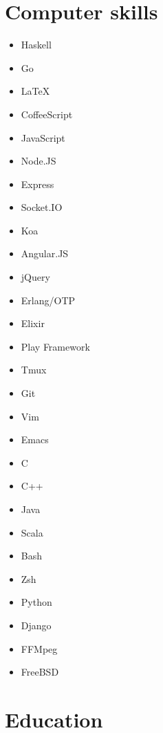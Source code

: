 \documentclass[11pt,a4paper,roman,english]{moderncv}        %
\begin{document}



\makecvtitle
\section{Computer skills}
\begin{multicols}{4}
	\begin{itemize}
		\item[] Haskell
		\item[] Go
		\item[] \LaTeX
		\item[] CoffeeScript
		\item[] JavaScript
		\item[] Node.JS
		\item[] Express
		\item[] Socket.IO
		\item[] Koa
		\item[] Angular.JS
		\item[] jQuery
		\item[] Erlang/OTP
		\item[] Elixir
		\item[] Play Framework
		\item[] Tmux
		\item[] Git
		\item[] Vim
		\item[] Emacs
		\item[] C
		\item[] C++
		\item[] Java
		\item[] Scala
		\item[] Bash
		\item[] Zsh
		\item[] Python
		\item[] Django
		\item[] FFMpeg
		\item[] FreeBSD
	\end{itemize}
\end{multicols}
\section{Education}
\end{document}

